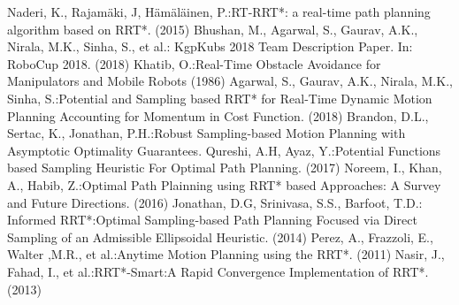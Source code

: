 \documentclass[runningheads]{llncs}
\begin{document}
\begin{thebibliography}{99}




Naderi, K., Rajamäki, J, Hämäläinen, P.:RT-RRT*: a real-time path planning algorithm based on RRT*. (2015)
Bhushan, M., Agarwal, S., Gaurav, A.K., Nirala, M.K., Sinha, S., et al.: KgpKubs 2018 Team Description Paper. In: RoboCup 2018. (2018)
Khatib, O.:Real-Time Obstacle Avoidance for Manipulators and Mobile Robots (1986)
Agarwal, S., Gaurav, A.K., Nirala, M.K., Sinha, S.:Potential and Sampling based RRT* for Real-Time Dynamic Motion Planning Accounting for Momentum in Cost Function. (2018)
Brandon, D.L., Sertac, K., Jonathan, P.H.:Robust Sampling-based Motion Planning with Asymptotic Optimality Guarantees.
Qureshi, A.H, Ayaz, Y.:Potential Functions based Sampling Heuristic For Optimal Path Planning. (2017)
Noreem, I., Khan, A., Habib, Z.:Optimal Path Plainning using RRT* based Approaches: A Survey and Future Directions. (2016)
Jonathan, D.G, Srinivasa, S.S., Barfoot, T.D.: Informed RRT*:Optimal Sampling-based Path Planning Focused via Direct Sampling of an Admissible Ellipsoidal Heuristic. (2014)
Perez, A., Frazzoli, E., Walter ,M.R., et al.:Anytime Motion Planning using the RRT*. (2011)
Nasir, J., Fahad, I., et al.:RRT*-Smart:A Rapid Convergence Implementation of RRT*. (2013)

\end{thebibliography}
\end{document}
